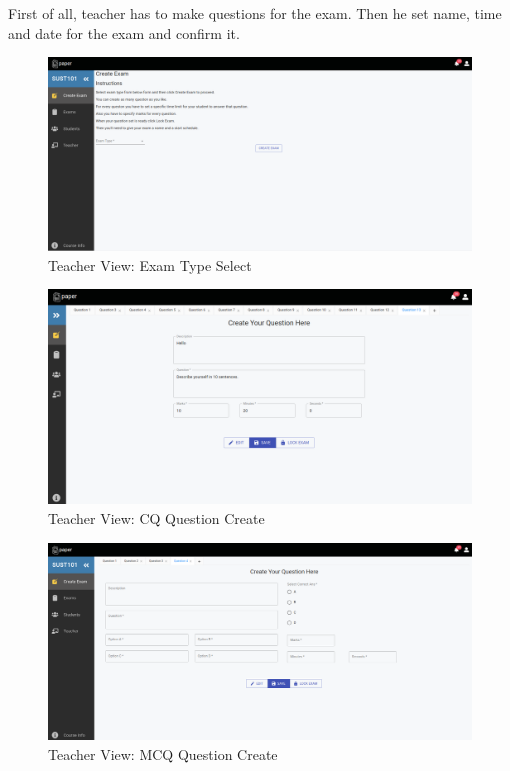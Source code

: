 \documentclass[10pt]{article}
\begin{document}
First of all, teacher has to make questions for the exam. Then he set name, time and date  for the exam and confirm it.

\begin{figure}[H]
  \centering
  \centerline{\includegraphics[width=\textwidth]{teacher/exam-create.png}}
  \caption{Teacher View: Exam Type Select}
  \label{fig}
\end{figure}


\begin{figure}[H]
  \centering
  \centerline{\includegraphics[width=\textwidth]{teacher/cq-create.png}}
  \caption{Teacher View: CQ Question Create}
  \label{fig}
\end{figure}

\begin{figure}[H]
  \centering
  \centerline{\includegraphics[width=\textwidth]{teacher/mcq-create.png}}
  \caption{Teacher View: MCQ Question Create}
  \label{fig}
\end{figure}
\end{document}
